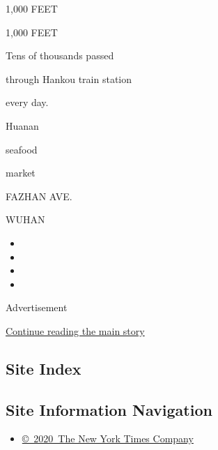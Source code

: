 1,000 FEET

1,000 FEET

Tens of thousands passed

through Hankou train station

every day.

Huanan

seafood

market

FAZHAN AVE.

WUHAN

\begin{itemize}
\item
\item
\item
\item
\end{itemize}

Advertisement

\protect\hyperlink{after-bottom}{Continue reading the main story}

\hypertarget{site-index}{%
\subsection{Site Index}\label{site-index}}

\hypertarget{site-information-navigation}{%
\subsection{Site Information
Navigation}\label{site-information-navigation}}

\begin{itemize}
\tightlist
\item
  \href{https://help.nytimes.com/hc/en-us/articles/115014792127-Copyright-notice}{©~2020~The
  New York Times Company}
\end{itemize}


